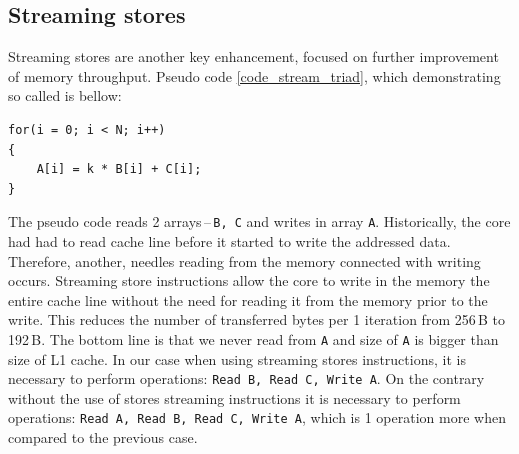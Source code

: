 \subsection{Streaming stores}
Streaming stores are another key enhancement, focused on further improvement of memory throughput. Pseudo code \ref{code_stream_triad}, which demonstrating so called  is bellow:



\bigskip
\begin{lstlisting}[caption=Streaming Triad example, captionpos=b, label=code_stream_triad]
for(i = 0; i < N; i++)
{
    A[i] = k * B[i] + C[i];
}
\end{lstlisting}
\bigskip

The pseudo code  reads 2 arrays\,--\,\texttt{B, C} and writes in array \texttt{A}. Historically, the core had had to read cache line before it started to write the addressed data. Therefore, another, needles reading from the memory connected with writing occurs. Streaming store instructions allow the core to write in the memory the entire cache line without the need for reading it from the memory prior to the write. This reduces the number of transferred bytes per 1 iteration from 256\,B to 192\,B. The bottom line is that we never read from \texttt{A} and size of \texttt{A} is bigger than size of L1 cache. In our case when using streaming stores instructions, it is necessary to perform operations: \texttt{Read B, Read C, Write A}. On the contrary without the use of stores streaming instructions it is necessary to perform operations: \texttt{Read A, Read B, Read C, Write A}, which is 1 operation more when compared to the previous case. 

